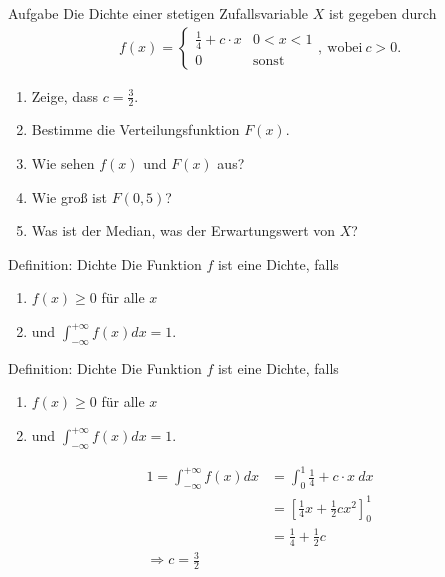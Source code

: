 \documentclass[t,11pt]{beamer}
\begin{document}
	\subtitle{}
	\logo{}
	\institute{}
	\date{}
	\subject{}

\addtocounter{framenumber}{-1}

\begin{frame}
	\begin{block}{Aufgabe}
		Die Dichte einer stetigen Zufallsvariable $X$ ist gegeben durch
		\begin{align*}
			f(x)=\begin{cases}
			\frac{1}{4}+c\cdot x & 0<x<1\\
			0 & \text{sonst}
			\end{cases},~\text{wobei}~c>0.
		\end{align*}
		\begin{enumerate}
			\item Zeige, dass $c=\frac{3}{2}$.
			\item Bestimme die Verteilungsfunktion $F(x)$.
			\item Wie sehen $f(x)$ und $F(x)$ aus?
			\item Wie groß ist $F(0,5)$?
			\item Was ist der Median, was der Erwartungswert von $X$?
		\end{enumerate}
	\end{block}
\end{frame}

\begin{frame}
	\begin{alertblock}{Definition: Dichte}
		Die Funktion $f$ ist eine Dichte, falls 
		\begin{enumerate}
			\item $f(x)\geq 0$ für alle $x$
			\item und $\int_{-\infty}^{+\infty} f(x)dx = 1$.
		\end{enumerate}
	\end{alertblock}
\end{frame}

\begin{frame}
\begin{alertblock}{Definition: Dichte}
	Die Funktion $f$ ist eine Dichte, falls 
	\begin{enumerate}
		\item $f(x)\geq 0$ für alle $x$
		\item und $\int_{-\infty}^{+\infty} f(x)dx = 1$.
	\end{enumerate}
\end{alertblock}
\begin{align*}
1 = \int_{-\infty}^{+\infty} f(x)dx &= \int_{0}^{1} \frac{1}{4}+c\cdot x~dx \\
&= \left[ \frac{1}{4}x + \frac{1}{2}cx^2 \right]^1_0  \\
&= \frac{1}{4}+\frac{1}{2}c \\
\Rightarrow c = \frac{3}{2}
\end{align*}
\end{frame}
\end{document}
